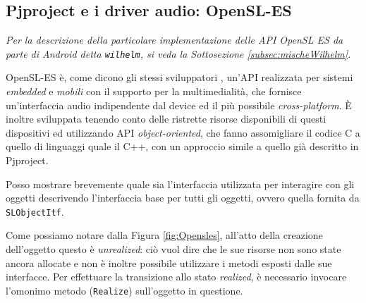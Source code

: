 \subsection{Pjproject e i driver audio: OpenSL-ES}\label{subsubsec:OnlyAudioOpenSles}
\textit{Per la descrizione della particolare implementazione delle API OpenSL ES
da parte di Android detta \texttt{wilhelm}, si veda la Sottosezione \vref{subsec:mischeWilhelm}.}
\bigskip

OpenSL-ES è, come dicono gli stessi sviluppatori \parencite{man:opensles}, un'API
realizzata per sistemi \textit{embedded} e \textit{mobili} con il supporto
per la multimedialità, che fornisce un'interfaccia audio indipendente dal
device ed il più possibile \textit{cross-platform}. È inoltre sviluppata tenendo
conto delle ristrette risorse disponibili di questi dispositivi ed utilizzando
API \textit{object-oriented}, che fanno assomigliare il codice C a quello di linguaggi
quale il C++, con un approccio simile a quello già descritto in Pjproject.

Posso mostrare brevemente quale sia l'interfaccia utilizzata per interagire con
gli oggetti descrivendo l'interfaccia base per tutti gli oggetti, ovvero quella
fornita da \texttt{\small SLObjectItf}.


Come possiamo notare dalla Figura  \vref{fig:Opensles},
all'atto della creazione dell'oggetto questo è \textit{unrealized}: ciò vuol dire che le sue risorse 
non sono state ancora allocate e non è inoltre possibile 
utilizzare i metodi esposti dalle sue interfacce. Per effettuare la transizione
allo stato \textit{realized}, è necessario invocare l'omonimo metodo (\texttt{\small Realize})
sull'oggetto in questione.

